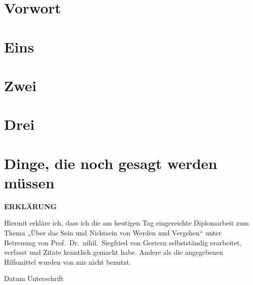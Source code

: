 \documentclass{scrbook}
\begin{document}
\chapter*{Vorwort}

\cleardoublepage

\tableofcontents

\mainmatter

\chapter{Eins}
\label{cha:eins}

\chapter{Zwei}
\label{cha:zwei}

\chapter{Drei}
\label{cha:drei}

\appendix

\chapter{Dinge, die noch gesagt werden müssen}
\label{cha:dinge-die-noch}

\backmatter

\printindex

\cleardoublepage

\thispagestyle{empty}

\hbox{}\vfill

\textbf{\large ERKLÄRUNG}

\bigskip \medskip

Hiermit erkläre ich, dass ich die am heutigen Tag eingereichte Diplomarbeit zum
Thema „Über das Sein und Nichtsein von Werden und Vergehen“ unter Betreuung von
Prof.~Dr.~nihil.~Siegfried von Gestern selbstständig erarbeitet, verfasst und
Zitate kenntlich gemacht habe. Andere als die angegebenen Hilfsmittel wurden von
mir nicht benutzt.

\vspace*{5\bigskipamount}

Datum \hfill Unterschrift

\normalsize

\vspace*{2\bigskipamount}

\vfill\hbox{}
\end{document}
